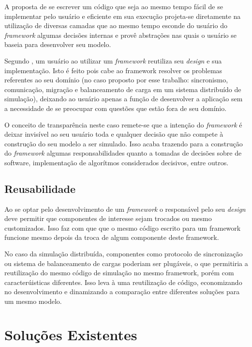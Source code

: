 A proposta de se escrever um código que seja ao mesmo tempo fácil de se implementar pelo usuário e eficiente em sua execução projeta-se diretamente na utilização de diversas camadas que ao mesmo tempo esconde do usuário do \textit{framework} algumas decisões internas e provê abstrações nas quais o usuário se baseia para desenvolver seu modelo.

Segundo \cite{DIRK00}, um usuário ao utilizar um \textit{framework} reutiliza seu \textit{design} e sua implementação. Isto é feito pois cabe ao framework resolver os problemas referentes ao seu domínio (no caso proposto por esse trabalho: sincronismo, comunicação, migração e balanceamento de carga em um sistema distribuído de simulação), deixando ao usuário apenas a função de desenvolver a aplicação sem a necessidade de se preocupar com questões que estão fora de seu domínio.

O conceito de transparência neste caso remete-se que a intenção do \textit{framework} é deixar invisível ao seu usuário toda e qualquer decisão que não compete à construção do seu modelo a ser simulado. Isso acaba trazendo para a construção do \textit{framework} algumas responsabilidades quanto a tomadas de decisões sobre  de software, implementação de algorítmos considerados decisivos, entre outros.

\subsection{Reusabilidade}

Ao se optar pelo desenvolvimento de um \textit{framework} o responsável pelo seu \textit{design} deve permitir que componentes de interesse sejam trocados ou mesmo customizados. Isso faz com que que o mesmo código escrito para um framework funcione mesmo depois da troca de algum componente deste framework.

No caso da simulação distribuída, componentes como protocolo de sincronização ou sistema de balanceamento de cargas poderiam ser plugáveis, o que permitiria a reutilização do mesmo código de simulação no mesmo framework, porém com caracterúisticas diferentes. Isso leva à uma reutilização de código, economizando no desenvolvimento e dinamizando a comparação entre diferentes soluções para um mesmo modelo.

\section{Soluções Existentes}

